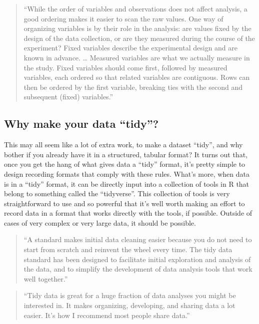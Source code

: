 \documentclass[]{tufte-book}
\begin{document}
\begin{quote}
``While the order of variables and observations does not affect analysis, a
good ordering makes it easier to scan the raw values. One way of organizing
variables is by their role in the analysis: are values fixed by the design of
the data collection, or are they measured during the course of the experiment?
Fixed variables describe the experimental design and are known in advance.
\ldots{} Measured variables are what we actually measure in the study. Fixed
variables should come first, followed by measured variables, each ordered so
that related variables are contiguous. Rows can then be ordered by the first
variable, breaking ties with the second and subsequent (fixed) variables.''
\citep{wickham2014tidy}
\end{quote}

\hypertarget{why-make-your-data-tidy}{%
\subsection{Why make your data ``tidy''?}\label{why-make-your-data-tidy}}

This may all seem like a lot of extra work, to make a dataset ``tidy'', and why
bother if you already have it in a structured, tabular format? It turns out
that, once you get the hang of what gives data a ``tidy'' format, it's pretty
simple to design recording formats that comply with these rules. What's more,
when data is in a ``tidy'' format, it can be directly input into a collection
of tools in R that belong to something called the ``tidyverse''. This collection
of tools is very straightforward to use and so powerful that it's well worth
making an effort to record data in a format that works directly with the
tools, if possible. Outside of cases of very complex or very large data, it
should be possible.

\begin{quote}
``A standard makes initial data cleaning easier because you do not need to
start from scratch and reinvent the wheel every time. The tidy data standard has
been designed to facilitate initial exploration and analysis of the data, and to
simplify the development of data analysis tools that work well together.''
\citep{wickham2014tidy}
\end{quote}

\begin{quote}
``Tidy data is great for a huge fraction of data analyses you might
be interested in. It makes organizing, developing, and sharing data a lot
easier. It's how I recommend most people share data.'' \citep{leek2017toward}
\end{quote}
\end{document}
